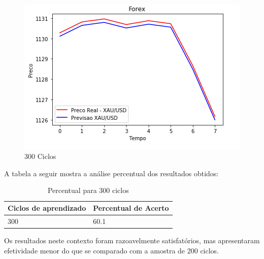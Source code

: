 \begin{figure}[h]
	\centering
	\includegraphics[keepaspectratio=true,scale=0.8]{figuras/300low.png}
	\caption{300 Ciclos}
	\label{fig18}
\end{figure}

\pagebreak

A tabela a seguir mostra a análise percentual dos resultados obtidos:

\begin{table}[h]
	\centering
	\caption{Percentual para 300 ciclos}
	\label{tab10}
  \begin{center}
      \begin{tabular}{ | l | p{5cm}}
      \hline
      Ciclos de aprendizado & Percentual de Acerto \\ \hline
		  300 & 60.1 \\ \hline
      \end{tabular}
  \end{center}
\end{table}

Os resultados neste contexto foram razoavelmente satisfatórios, mas apresentaram efetividade menor do que se comparado com a amostra de 200 ciclos.

\pagebreak
